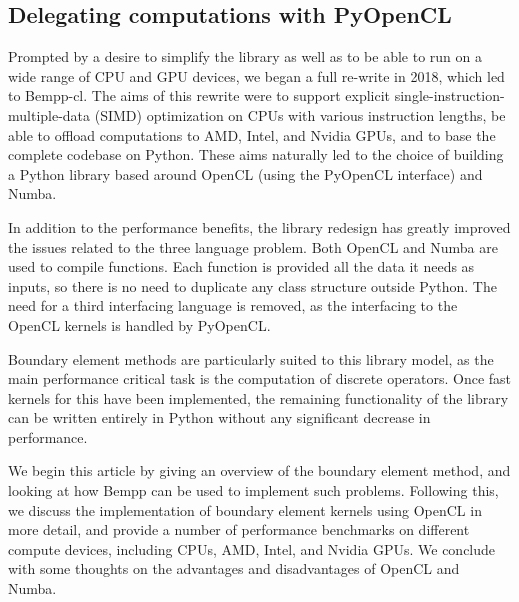 \subsection{Delegating computations with PyOpenCL}
Prompted by a desire to simplify the library as well as to be able to run on a wide range of CPU and GPU devices, we began a full re-write in 2018, which led to Bempp-cl. The aims of this rewrite were to support explicit single-instruction-multiple-data (SIMD) optimization on CPUs with various instruction lengths, be able to offload computations to AMD, Intel, and Nvidia GPUs, and to base the complete codebase on Python. These aims naturally led to the choice of building a Python library based around OpenCL (using the PyOpenCL interface) and Numba.

In addition to the performance benefits, the library redesign has greatly improved the issues related to the three language problem. Both OpenCL and Numba are used to compile functions. Each function is provided all the data it needs as inputs, so there is no need to duplicate any class structure outside Python. The need for a third interfacing language is removed, as the interfacing to the OpenCL kernels is handled by PyOpenCL.

Boundary element methods are particularly suited to this library model, as the main performance critical task is the computation of discrete operators. Once fast kernels for this have been implemented, the remaining functionality of the library can be written entirely in Python without any significant decrease in performance.

\bigskip

We begin this article by giving an overview of the boundary element method, and looking at how Bempp can be used to implement such problems. Following this, we discuss the implementation of boundary element kernels using OpenCL in more detail, and provide a number of performance benchmarks on different compute devices, including CPUs, AMD, Intel, and Nvidia GPUs. We conclude with some thoughts on the advantages and disadvantages of OpenCL and Numba.


